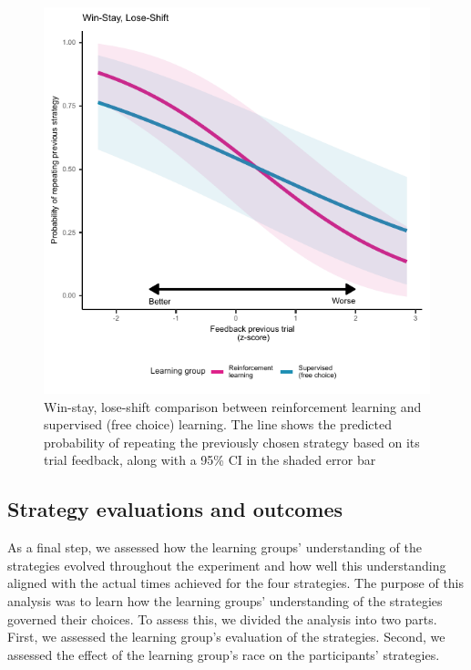 \documentclass[pdflatex,sn-nature]{sn-jnl}%
\theoremstyle{thmstyleone}%
\theoremstyle{thmstyletwo}%
\theoremstyle{thmstylethree}%
\begin{document}
\begin{figure}[H]
\centering
\includegraphics{figures/figure_winstayloseshift.pdf}
\caption{Win-stay, lose-shift comparison between reinforcement learning and supervised (free choice) learning. The line shows the predicted probability of repeating the previously chosen strategy based on its trial feedback, along with a 95\% CI in the shaded error bar} \label{fig: choice_wsls}
\end{figure}


\subsection{Strategy evaluations and outcomes}
As a final step, we assessed how the learning groups' understanding of the strategies evolved throughout the experiment and how well this understanding aligned with the actual times achieved for the four strategies. The purpose of this analysis was to learn how the learning groups' understanding of the strategies governed their choices. To assess this, we divided the analysis into two parts. First, we assessed the learning group's evaluation of the strategies. Second, we assessed the effect of the learning group's race on the participants’ strategies. 
\end{document}
